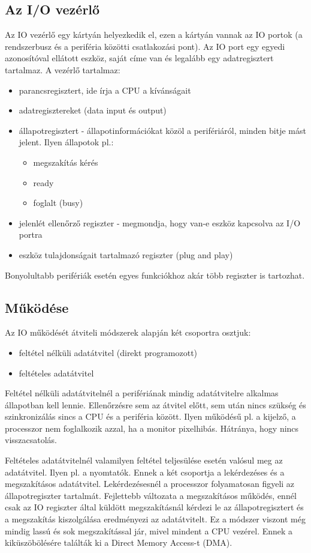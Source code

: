 \subsection{Az I/O vezérlő}
Az IO vezérlő egy kártyán helyezkedik el, ezen a kártyán vannak az IO portok (a rendszerbusz és a periféria közötti csatlakozási pont).
Az IO port egy egyedi azonosítóval ellátott eszköz, saját címe van és legalább egy adatregisztert tartalmaz.
A vezérlő tartalmaz:
\begin{itemize}
    \item parancsregisztert, ide írja a CPU a kívánságait
    \item adatregisztereket (data input és output)
    \item állapotregisztert - állapotinformációkat közöl a perifériáról, minden bitje mást jelent. Ilyen állapotok pl.:
    \begin{itemize}
        \item megszakítás kérés
        \item ready
        \item foglalt (busy)
    \end{itemize}
    \item jelenlét ellenőrző regiszter - megmondja, hogy van-e eszköz kapcsolva az I/O portra
    \item eszköz tulajdonságait tartalmazó regiszter (plug and play)
\end{itemize}
Bonyolultabb perifériák esetén egyes funkciókhoz akár több regiszter is tartozhat.

\subsection{Működése}
Az IO működését átviteli módszerek alapján két csoportra osztjuk:
\begin{itemize}
    \item feltétel nélküli adatátvitel (direkt programozott)
    \item feltételes adatátvitel
\end{itemize}
Feltétel nélküli adatátvitelnél a perifériának mindig adatátvitelre alkalmas állapotban kell lennie.
Ellenőrzésre sem az átvitel előtt, sem után nincs szükség és szinkronizálás sincs a CPU és a periféria között.
Ilyen működésű pl. a kijelző, a processzor nem foglalkozik azzal, ha a monitor pixelhibás.
Hátránya, hogy nincs visszacsatolás.

Feltételes adatátvitelnél valamilyen feltétel teljesülése esetén valósul meg az adatátvitel.
Ilyen pl. a nyomtatók.
Ennek a két csoportja a lekérdezéses és a megszakításos adatátvitel.
Lekérdezésesnél a processzor folyamatosan figyeli az állapotregiszter tartalmát.
Fejlettebb változata a megszakításos működés, ennél csak az IO regiszter által küldött megszakításnál kérdezi le az állapotregisztert és a megszakítás kiszolgálása eredményezi az adatátvitelt.
Ez a módszer viszont még mindig lassú és sok megszakítással jár, mivel mindent a CPU vezérel.
Ennek a kiküszöbölésére találták ki a Direct Memory Access-t (DMA).

